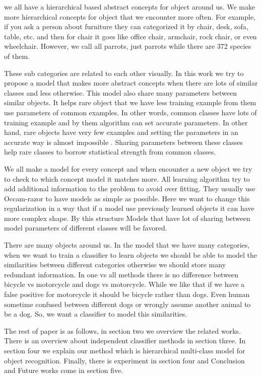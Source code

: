 \documentclass[10pt,twocolumn,letterpaper]{article}
\begin{document}
we all have a hierarchical based abstract concepts for object around us. We make more hierarchical concepts for object that we encounter more often. For example, if you ask a person about furniture they can categorized it by chair, desk, sofa, table, etc. and then for chair it goes like office chair, armchair, rock chair, or even wheelchair. However, we call all parrots, just parrots while there are 372 species of them.

These sub categories are related to each other visually. In this work we try to propose a model that makes more abstract concepts when there are lots of similar classes and less otherwise. This model also share many parameters between similar objects. It helps rare object that we have less training example from them use parameters of common examples. In other words, common classes have lots of training example and by them algorithm can set accurate parameters. In other hand, rare objects have very few examples and setting the parameters in an accurate way is almost impossible . Sharing parameters between these classes help rare classes to borrow statistical strength from common classes. 

We all make a model for every concept and when encounter a new object we try to check to which concept model it matches more. All learning algorithm try to add additional information to the problem to avoid over fitting. They usually use Occam-razor to have models as simple as possible. Here we want to change this regularization in a way that if a model use previously learned objects it can have more complex shape. By this structure Models that have lot of sharing between model parameters of different classes will be favored.

There are many objects around us. In the model that we have many categories, when we want to train a classifier to learn objects we should be able to model the similarities between different categories otherwise we should store many redundant information. In one vs all methods there is no difference between bicycle vs motorcycle and dogs vs motorcycle. While we like that if we have a false positive for motorcycle it should be bicycle rather than dogs. Even human sometime confused between different dogs or wrongly assume another animal to be a dog. So, we want a classifier to model this similarities.  

The rest of paper is as follows, in section two we overview the related works. There is an overview about independent classifier methods in section three. In section four we explain our method which is hierarchical multi-class model for object recognition. Finally, there is experiment in section four and Conclusion and Future works come in section five.
\end{document}
